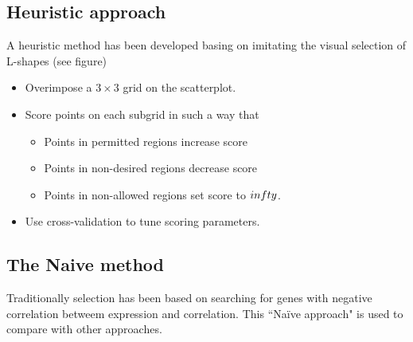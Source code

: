 \subsection{Heuristic approach}
A heuristic method has been developed basing on imitating the visual selection of L-shapes (see figure)
\begin{itemize}
\item Overimpose a $3\times 3$ grid on the scatterplot.
\item Score points on each subgrid in such a way that
\begin{itemize}
	\item Points in permitted regions increase score
	\item Points in non-desired regions decrease score
	\item Points in non-allowed regions set score to $\-infty$.
\end{itemize}
\item Use cross-validation to tune scoring parameters.
\end{itemize}

\subsection{The Naive method}

Traditionally selection has been based on searching for genes with negative correlation betweem expression and correlation. This ``Naïve approach" is used to compare with other approaches.
